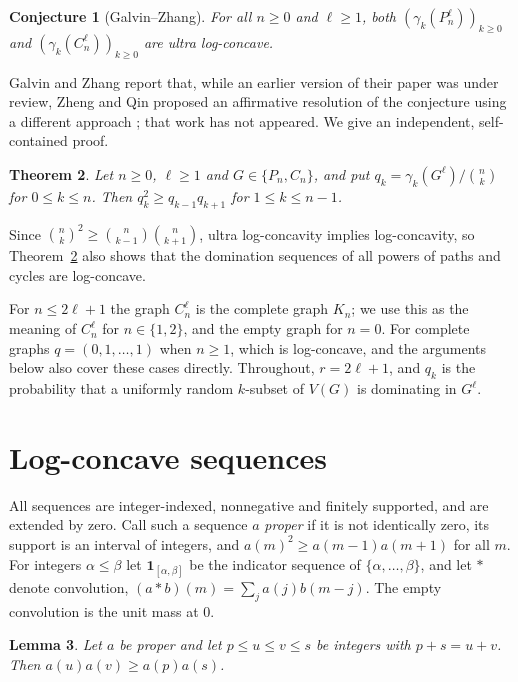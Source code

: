 \documentclass[11pt,a4paper]{amsart}
\newtheorem{theorem}{Theorem}[section]
\newtheorem{lemma}[theorem]{Lemma}
\newtheorem{conjecture}[theorem]{Conjecture}
\theoremstyle{definition}
\theoremstyle{remark}
\newcommand{\one}{\mathbf 1}
\begin{document}
\begin{conjecture}[Galvin--Zhang]\label{conj}
For all $n\ge 0$ and $\ell\ge 1$, both $(\gamma_k(P_n^\ell))_{k\ge0}$ and $(\gamma_k(C_n^\ell))_{k\ge0}$ are ultra log-concave.
\end{conjecture}

Galvin and Zhang report that, while an earlier version of their paper was under review, Zheng and Qin proposed an affirmative resolution of the conjecture using a different approach \cite[Section~1]{GZ}; that work has not appeared. We give an independent, self-contained proof.

\begin{theorem}\label{thm:main}
Let $n\ge 0$, $\ell\ge 1$ and $G\in\{P_n,C_n\}$, and put $q_k=\gamma_k(G^\ell)/\binom nk$ for $0\le k\le n$. Then $q_k^2\ge q_{k-1}q_{k+1}$ for $1\le k\le n-1$.
\end{theorem}

Since $\binom nk^2\ge\binom n{k-1}\binom n{k+1}$, ultra log-concavity implies log-concavity, so Theorem~\ref{thm:main} also shows that the domination sequences of all powers of paths and cycles are log-concave.

For $n\le 2\ell+1$ the graph $C_n^\ell$ is the complete graph $K_n$; we use this as the meaning of $C_n^\ell$ for $n\in\{1,2\}$, and the empty graph for $n=0$. For complete graphs $q=(0,1,\dots,1)$ when $n\ge1$, which is log-concave, and the arguments below also cover these cases directly. Throughout, $r=2\ell+1$, and $q_k$ is the probability that a uniformly random $k$-subset of $V(G)$ is dominating in $G^\ell$.

\section{Log-concave sequences}

All sequences are integer-indexed, nonnegative and finitely supported, and are extended by zero. Call such a sequence $a$ \emph{proper} if it is not identically zero, its support is an interval of integers, and $a(m)^2\ge a(m-1)a(m+1)$ for all $m$. For integers $\alpha\le\beta$ let $\one_{[\alpha,\beta]}$ be the indicator sequence of $\{\alpha,\dots,\beta\}$, and let $*$ denote convolution, $(a*b)(m)=\sum_j a(j)b(m-j)$. The empty convolution is the unit mass at $0$.

\begin{lemma}\label{lem:inward}
Let $a$ be proper and let $p\le u\le v\le s$ be integers with $p+s=u+v$. Then $a(u)a(v)\ge a(p)a(s)$.
\end{lemma}
\end{document}
